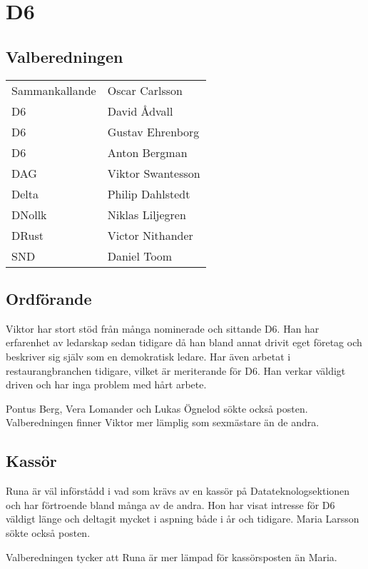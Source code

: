 \section{D6}

\subsection{Valberedningen}
\begin{autoframe}

\begin{tabular}{ll}
Sammankallande & Oscar Carlsson \\
D6 & David Ådvall \\
D6 & Gustav Ehrenborg \\
D6 & Anton Bergman \\
DAG  & Viktor Swantesson \\
Delta  & Philip Dahlstedt \\
DNollk & Niklas Liljegren \\
DRust & Victor Nithander \\
SND  & Daniel Toom
\end{tabular}

\end{autoframe}



\subsection{Ordförande}
\begin{autoframe}
Viktor har stort stöd från många nominerade och sittande D6. Han har erfarenhet av ledarskap
sedan tidigare då han bland annat drivit eget företag och beskriver sig själv som en demokratisk
ledare. Har även arbetat i restaurangbranchen tidigare, vilket är meriterande för D6.
Han verkar väldigt driven och har inga problem med hårt arbete.

\bigskip
Pontus Berg, Vera Lomander och Lukas Ögnelod sökte också posten. Valberedningen finner
Viktor mer lämplig som sexmästare än de andra.
\end{autoframe}

\subsection{Kassör}
\begin{autoframe}
Runa är väl införstådd i vad som krävs av en kassör på Datateknologsektionen och har
förtroende bland många av de andra. Hon har visat intresse för D6 väldigt länge och deltagit
mycket i aspning både i år och tidigare.
Maria Larsson sökte också posten.

\bigskip
Valberedningen tycker att Runa är mer lämpad för
kassörsposten än Maria.
\end{autoframe}

